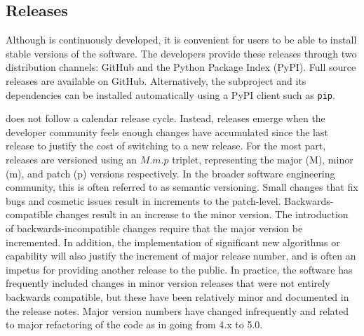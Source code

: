 \subsection{Releases}

Although \clawpack is continuously developed, it is convenient for
users to be able to install stable versions of the software.  The
\clawpack developers provide these releases through two distribution
channels: GitHub and the Python Package Index (PyPI).  Full source
releases are available on GitHub.  Alternatively, the \pyclaw
subproject and its dependencies can be installed automatically using a
PyPI client such as \texttt{pip}.

\clawpack does not follow a calendar release cycle.  Instead, releases
emerge when the developer community feels enough changes have
accumulated since the last release to justify
the cost of switching to a new release.  For the most part, \clawpack
releases are
versioned using an $M.m.p$ triplet, representing the major (M), minor (m), and
patch (p) versions respectively.  In the broader software engineering
community, this is often referred to as semantic versioning.  Small
changes that fix bugs and cosmetic issues result in increments to the
patch-level.  Backwards-compatible changes result in an increase to
the minor version.  The introduction of backwards-incompatible changes
require that the major version be incremented.  In addition, the
implementation of significant new algorithms or capability will also
justify the increment of major release number, and is often an impetus
for providing another release to the public.
In practice, the \clawpack software has frequently included changes in minor
version releases that were not entirely backwards compatible, but these have
been relatively minor and documented in the release notes.  Major version
numbers have changed infrequently and related to major refactoring of the
code as in going from 4.x to 5.0.

